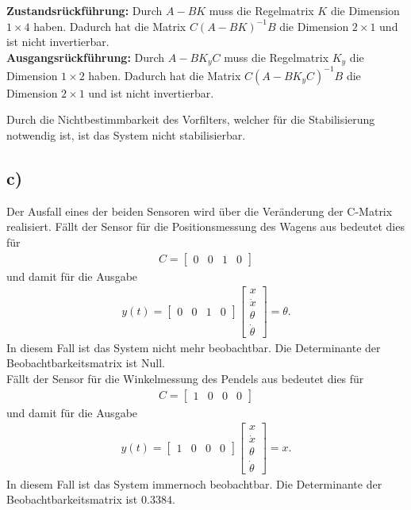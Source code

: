 \documentclass[11pt]{scrartcl} %
\begin{document}
\textbf{Zustandsrückführung:} Durch $A-BK$ muss die Regelmatrix $K$ die Dimension $1 \times 4$ haben. Dadurch hat die Matrix $C \left( A-BK \right)^{-1}B$ die Dimension $2 \times 1$ und ist nicht invertierbar.\\

\textbf{Ausgangsrückführung:} Durch $A-BK_yC$ muss die Regelmatrix $K_y$ die Dimension $1 \times 2$ haben. Dadurch hat die Matrix $C \left( A-BK_yC \right)^{-1}B$ die Dimension $2 \times 1$ und ist nicht invertierbar.

Durch die Nichtbestimmbarkeit des Vorfilters, welcher für die Stabilisierung notwendig ist, ist das System nicht stabilisierbar.

\subsection*{c)}
Der Ausfall eines der beiden Sensoren wird über die Veränderung der C-Matrix realisiert. Fällt der Sensor für die Positionsmessung des Wagens aus bedeutet dies für
\begin{align*}
C = \begin{bmatrix}
0 & 0 & 1 & 0
\end{bmatrix}
\end{align*}
und damit für die Ausgabe
\begin{align*}
y(t) = \begin{bmatrix}
0 & 0 & 1 & 0
\end{bmatrix} \begin{bmatrix}
x\\\dot{x}\\\theta\\\dot{\theta}
\end{bmatrix} = \theta.
\end{align*}
In diesem Fall ist das System nicht mehr beobachtbar. Die Determinante der Beobachtbarkeitsmatrix ist Null.\\

Fällt der Sensor für die Winkelmessung des Pendels aus bedeutet dies für 
\begin{align*}
C = \begin{bmatrix}
1 & 0 & 0 & 0
\end{bmatrix}
\end{align*}
und damit für die Ausgabe
\begin{align*}
y(t) = \begin{bmatrix}
1 & 0 & 0 & 0
\end{bmatrix} \begin{bmatrix}
x\\\dot{x}\\\theta\\\dot{\theta}
\end{bmatrix} = x.
\end{align*}
In diesem Fall ist das System immernoch beobachtbar. Die Determinante der Beobachtbarkeitsmatrix ist $0.3384$.
\end{document}
